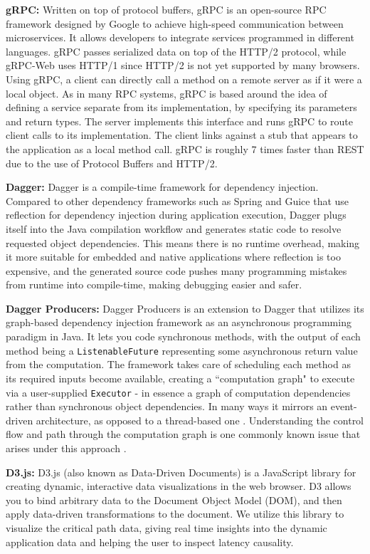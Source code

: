 \documentclass[11pt, twoside, twocolumn]{extarticle}
\begin{document}
\textbf{gRPC:} Written on top of protocol buffers, gRPC\cite{grpc} is an open-source RPC framework designed by Google to achieve high-speed communication between microservices. It allows developers to integrate services programmed in different languages. gRPC passes serialized data on top of the HTTP/2 protocol, while gRPC-Web uses HTTP/1 since HTTP/2 is not yet supported by many browsers. Using gRPC, a client can directly call a method on a remote server as if it were a local object.  As in many RPC systems, gRPC is based around the idea of defining a service separate from its implementation, by specifying its parameters and return types. The server implements this interface and runs gRPC to route client calls to its implementation. The client links against a stub that appears to the application as a local method call. gRPC is roughly 7 times faster than REST due to the use of Protocol Buffers and HTTP/2\cite{gRPCvsREST}.

\textbf{Dagger:} Dagger\cite{dagger} is a compile-time framework for dependency injection. Compared to other dependency frameworks such as Spring and Guice that use reflection for dependency injection during application execution, Dagger plugs itself into the Java compilation workflow and generates static code to resolve requested object dependencies. This means there is no runtime overhead, making it more suitable for embedded and native applications where reflection is too expensive, and the generated source code pushes many programming mistakes from runtime into compile-time, making debugging easier and safer.

\textbf{Dagger Producers:} Dagger Producers\cite{daggerproducers} is an extension to Dagger that utilizes its graph-based dependency injection framework as an asynchronous programming paradigm in Java. It lets you code synchronous methods, with the output of each method being a \lstinline{ListenableFuture} representing some asynchronous return value from the computation.  The framework takes care of scheduling each method as its required inputs become available, creating a ``computation graph" to execute via a user-supplied \lstinline{Executor} - in essence a graph of computation dependencies rather than synchronous object dependencies.  In many ways it mirrors an event-driven architecture, as opposed to a thread-based one \cite{threadbad}.  Understanding the control flow and path through the computation graph is one commonly known issue that arises under this approach \cite{270302}.

\textbf{D3.js:} D3.js\cite{d3js} (also known as Data-Driven Documents) is a JavaScript library for creating dynamic, interactive data visualizations in the web browser.  D3 allows you to bind arbitrary data to the Document Object Model (DOM), and then apply data-driven transformations to the document. We utilize this library to visualize the critical path data, giving real time insights into the dynamic application data and helping the user to inspect latency causality.
\end{document}

